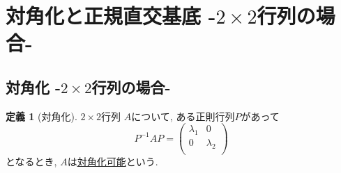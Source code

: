 \documentclass[dvipdfmx,a4paper,11pt]{article}
\theoremstyle{definition}
\newtheorem{dfn}[thm]{定義}
\begin{document}
\newpage

\section{対角化と正規直交基底 -$2 \times 2$行列の場合-}
\label{sec-4}
\subsection{対角化 -$2 \times 2$行列の場合-}

  \begin{tcolorbox}[
    colback = white,
    colframe = green!35!black,
    fonttitle = \bfseries,
    breakable = true]
    \begin{dfn}[対角化]
    
$2 \times 2$行列
$A$について, ある正則行列$P$があって
$$
P^{-1} A P=
\begin{pmatrix}
\lambda_1& 0 \\
0& \lambda_2\\
\end{pmatrix}
$$
となるとき, $A$は\underline{対角化可能}という.
  \end{dfn}
 \end{tcolorbox}
\end{document}
